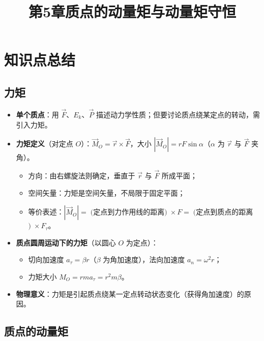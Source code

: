 \documentclass[12pt,a4paper]{ctexart}
\title{第5章\quad 质点的动量矩与动量矩守恒}
\author{}
\date{}
\begin{document}
\maketitle

\section{知识点总结}

\subsection{力矩}

\begin{itemize}
    \item \textbf{单个质点}：用 $\vec{F}$、$E_k$、$\vec{P}$ 描述动力学性质；但要讨论质点绕某定点的转动，需引入力矩。
    \item \textbf{力矩定义}（对定点 $O$）：$\vec{M}_O = \vec{r}\times\vec{F}$，大小 $|\vec{M}_O| = rF\sin\alpha$（$\alpha$ 为 $\vec{r}$ 与 $\vec{F}$ 夹角）。
    \begin{itemize}
        \item 方向：由右螺旋法则确定，垂直于 $\vec{r}$ 与 $\vec{F}$ 所成平面；
        \item 空间矢量：力矩是空间矢量，不局限于固定平面；
        \item 等价表述：$|\vec{M}_O| = \;($定点到力作用线的距离$)\;\times F = \;($定点到质点的距离$)\;\times F_\tau$。
    \end{itemize}
    \item \textbf{质点圆周运动下的力矩}（以圆心 $O$ 为定点）：
    \begin{itemize}
        \item 切向加速度 $a_\tau = \beta r$（$\beta$ 为角加速度），法向加速度 $a_n = \omega^2 r$；
        \item 力矩大小 $M_O = r m a_\tau = r^2 m\beta$。
    \end{itemize}
    \item \textbf{物理意义}：力矩是引起质点绕某一定点转动状态变化（获得角加速度）的原因。
\end{itemize}

\subsection{质点的动量矩}
\end{document}
